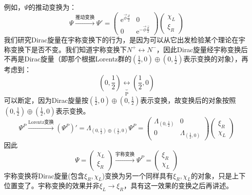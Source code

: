 例如，$\Psi$的推动变换为：
\begin{equation}
\label{equ3.229}
    \Psi \stackrel{\text{推动变换}}{\longrightarrow} \Psi' =
        \begin{pmatrix}
            \mathrm{e}^{\vec{\phi} \frac{\vec{\sigma}}{2}} & 0 \\
            0 & \mathrm{e}^{-\vec{\phi} \frac{\vec{\sigma}}{2}}
        \end{pmatrix}
        \begin{pmatrix}
            \chi_L \\ \xi_R
        \end{pmatrix}
\end{equation}
我们研究Dirac旋量在宇称变换下的行为，是因为可以从它出发检验某个理论在宇称变换下是否不变。我们知道宇称变换下$N^+ \leftrightarrow N^-$，因此Dirac旋量经宇称变换后不再是Dirac旋量（即那个根据Lorentz群的$(\frac{1}{2}, 0) \oplus (0, \frac{1}{2})$表示变换的对象），再考虑到：
\begin{equation}
\label{equ3.230}
    \left( 0, \frac{1}{2} \right) \underbrace{\leftrightarrow}_{\mathrm{P}} \left( \frac{1}{2}, 0 \right)
\end{equation}
可以断定，因为Dirac旋量按$(\frac{1}{2}, 0) \oplus (0, \frac{1}{2})$表示变换，故变换后的对象按照$ (0, \frac{1}{2}) \oplus (\frac{1}{2}, 0)$表示变换。
\begin{equation}
\label{equ3.231}
    \Psi^P \stackrel{\text{Lorentz变换}}{\longrightarrow} (\Psi^P)' = \Lambda_{ (0, \frac{1}{2}) \oplus (\frac{1}{2}, 0)} \Psi^P =
        \begin{pmatrix}
            \Lambda_{(0, \frac{1}{2})} & 0 \\
            0 & \Lambda_{(\frac{1}{2}, 0)}
        \end{pmatrix}
        \begin{pmatrix}
            \xi_R \\ \chi_L
        \end{pmatrix}
\end{equation}
因此
\begin{equation}
\label{equ3.232}
    \Psi =
        \begin{pmatrix}
            \chi_L \\ \xi_R
        \end{pmatrix}
    \stackrel{\text{宇称变换}}{\longrightarrow}
    \Psi^P =
        \begin{pmatrix}
            \xi_R \\ \chi_L
        \end{pmatrix}
\end{equation}
宇称变换将Dirac旋量(包含$\xi_R, \chi_L$)变换为另一个同样具有$\xi_R, \chi_L$的对象，只是上下位置变了。宇称变换的效果并非$\xi_L \rightarrow \xi_R$，具有这一效果的变换之后再讲述。

